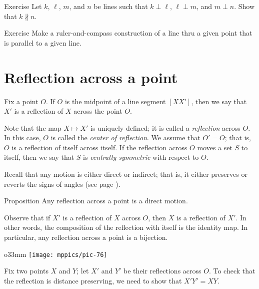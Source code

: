 \begin{thm}{Exercise}\label{ex:perp-perp}
Let $k$, $\ell$, $m$, and $n$ be lines such that $k\perp \ell$, $\ell\perp m$, and $m\perp n$.
Show that $k\nparallel n$.
\end{thm}

\begin{thm}{Exercise}\label{ex:construction-parallel}
Make a ruler-and-compass construction of a line thru a given point that is parallel to a given line.
\end{thm}

\section*{Reflection across a point}

Fix a point $O$.
If $O$ is the midpoint of a line segment $[XX']$, then we say that $X'$ is a reflection of $X$ across the point $O$.

Note that the map $X\mapsto X'$ is uniquely defined; it is called a \emph{reflection} across $O$.
In this case, $O$ is called the \emph{center of reflection}. 
We assume that $O'=O$; that is, $O$ is a reflection of itself across itself.
If the reflection across $O$ moves a set $S$ to itself, then we say that $S$ is \emph{centrally symmetric} with respect to $O$. 

Recall that any motion is either direct or indirect;
that is, it either preserves or reverts the signs of angles (see page \pageref{direct motion}). 

\begin{thm}[\abs]{Proposition}\label{prop:point-reflection}
Any reflection across a point is a direct motion.
\end{thm}

Observe that if $X'$ is a reflection of $X$ across $O$, 
then $X$ is a reflection of $X'$.
In other words, the composition of the reflection with itself is the identity map.
In particular, any reflection across a point is a bijection.

\begin{wrapfigure}{o}{33mm}
\centering
\texttt{[image: mppics/pic-76]}
\end{wrapfigure}

Fix two points $X$ and $Y$;
let $X'$ and $Y'$ be their reflections across $O$.
To check that the reflection is distance preserving, we need to show that $X'Y'=XY$.

